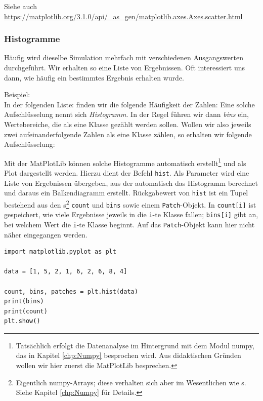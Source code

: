 Siehe auch \url{https://matplotlib.org/3.1.0/api/_as_gen/matplotlib.axes.Axes.scatter.html}

\subsubsection{Histogramme}
Häufig wird dieselbe Simulation mehrfach mit verschiedenen Ausgangswerten durchgeführt. Wir erhalten so eine Liste von Ergebnissen. Oft interessiert uns dann, wie häufig ein bestimmtes Ergebnis erhalten wurde. 

Beispiel:\\
In der folgenden Liste:
finden wir die folgende Häufigkeit der Zahlen:
Eine solche Aufschlüsselung nennt sich \emph{Histogramm}. In der Regel führen wir dann \emph{bins} ein, \ie Wertebereiche, die als eine Klasse gezählt werden sollen. Wollen wir also jeweils zwei aufeinanderfolgende Zahlen als eine Klasse zählen, so erhalten wir folgende Aufschlüsselung:

Mit der MatPlotLib können solche Histogramme automatisch erstellt\footnote{Tatsächlich erfolgt die Datenanalyse im Hintergrund mit dem Modul numpy, das in Kapitel \ref{chp:Numpy} besprochen wird. Aus didaktischen Gründen wollen wir hier zuerst die MatPlotLib besprechen.} und als Plot dargestellt werden. Hierzu dient der Befehl \texttt{hist}. Als Parameter wird eine Liste von Ergebnissen übergeben, aus der automatisch das Histogramm berechnet und daraus ein Balkendiagramm erstellt. Rückgabewert von \texttt{hist} ist ein Tupel bestehend aus den s\footnote{Eigentlich numpy-Arrays; diese verhalten sich aber im Wesentlichen wie s. Siehe Kapitel \ref{chp:Numpy} für Details.} \texttt{count} und \texttt{bins} sowie einem \texttt{Patch}-Objekt. In \texttt{count[i]} ist gespeichert, wie viele Ergebnisse jeweils in die \texttt{i}-te Klasse fallen; \texttt{bins[i]} gibt an, bei welchem Wert die \texttt{i}-te Klasse beginnt. Auf das \texttt{Patch}-Objekt kann hier nicht näher eingegangen werden.

\begin{codebox}
\begin{verbatim}
import matplotlib.pyplot as plt

data = [1, 5, 2, 1, 6, 2, 6, 8, 4]

count, bins, patches = plt.hist(data)
print(bins)
print(count)
plt.show()
\end{verbatim}
\end{codebox}

